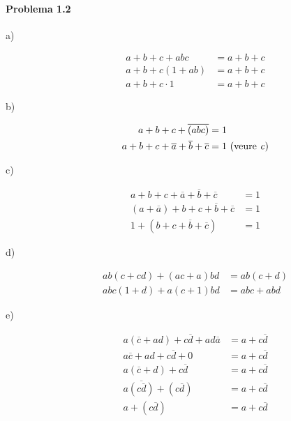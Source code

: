 \documentclass[catalan,border=15pt,class=scrartcl,multi=minipage]{standalone}
\begin{document}
\begin{minipage}{30em}

\paragraph{Problema 1.2}

\begin{description}

\item[{a)}] \begin{align*}
  a + b + c + abc &= a + b + c \\
  a + b + c\left(1 + ab\right) &= a + b + c \\
  a + b + c \cdot 1 &= a + b + c
\end{align*}

\item[{b)}] \begin{align*}
  a + b + c + \overline{\left(abc\right)} &= 1 \\
  a + b + c + \overline{a} + \overline{b} + \overline{c} &= 1 \,\, \text{(veure \emph{c})}
\end{align*}

\item[{c)}] \begin{align*}
  a + b + c + \overline{a} + \overline{b} + \overline{c} &= 1 \\
  \left(a + \overline{a}\right) + b + c + \overline{b} + \overline{c} &= 1 \\
  1 + \left(b + c + \overline{b} + \overline{c}\right) &= 1
\end{align*}

\item[{d)}] \begin{align*}
  ab\left(c + cd\right) + \left(ac + a\right)bd &= ab\left(c + d\right) \\
  abc\left(1 + d\right) + a\left(c + 1\right)bd &= abc + abd
\end{align*}

\item[{e)}] \begin{align*}
  a\left(\overline{c} + ad\right) + c\overline{d} + ad\overline{a} &= a + c\overline{d} \\
  a\overline{c} + ad + c\overline{d} + 0 &= a + c\overline{d} \\
  a\left(\overline{c} + d\right) + c\overline{d} &= a + c\overline{d} \\
  a\overline{\left(c\overline{d}\right)} + \left(c\overline{d}\right) &= a + c\overline{d} \\
  a + \left(c\overline{d}\right) &= a + c\overline{d}
\end{align*}


\end{description}
\end{minipage}
\end{document}
